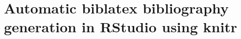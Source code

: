 \documentclass{article}
\begin{document}
 
\section*{Automatic biblatex bibliography generation in RStudio using knitr}
 
\end{document}
